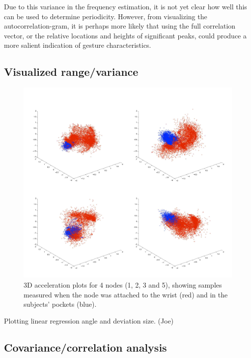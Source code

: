 \documentclass{article}
\begin{document}
Due to this variance in the frequency estimation, it is not yet clear
how well this can be used to determine periodicity.  However, from
visualizing the autocorrelation-gram, it is perhaps more likely that
using the full correlation vector, or the relative locations and
heights of significant peaks, could produce a more salient indication
of gesture characteristics.

\subsection{Visualized range/variance}

\begin{figure}
\centerline{\includegraphics[width=\textwidth]{images/accel_smoothed5_nodes1235.jpg}}
\caption{3D acceleration plots for 4 nodes (1, 2, 3 and 5), showing samples measured when the node was attached to the wrist (red) and in the subjects' pockets (blue).}
\label{fig:accel_smoothed_4nodes}
\end{figure}


Plotting linear regression angle and deviation size. (Joe)

\subsection{Covariance/correlation analysis}
\end{document}
